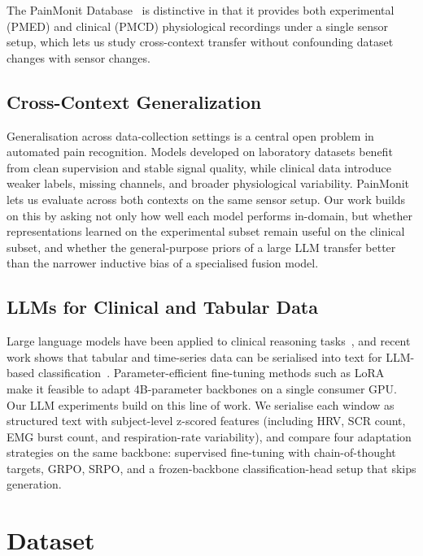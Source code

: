 \documentclass{article}
\begin{document}
The PainMonit Database~\citep{gouverneur2024painmonit} is distinctive in that it provides both experimental (PMED) and clinical (PMCD) physiological recordings under a single sensor setup, which lets us study cross-context transfer without confounding dataset changes with sensor changes.

\subsection{Cross-Context Generalization}

Generalisation across data-collection settings is a central open problem in automated pain recognition. Models developed on laboratory datasets benefit from clean supervision and stable signal quality, while clinical data introduce weaker labels, missing channels, and broader physiological variability. PainMonit~\citep{gouverneur2024painmonit} lets us evaluate across both contexts on the same sensor setup. Our work builds on this by asking not only how well each model performs in-domain, but whether representations learned on the experimental subset remain useful on the clinical subset, and whether the general-purpose priors of a large LLM transfer better than the narrower inductive bias of a specialised fusion model.

\subsection{LLMs for Clinical and Tabular Data}

Large language models have been applied to clinical reasoning tasks~\citep{singhal2023medpalm,nori2023gpt4medicine}, and recent work shows that tabular and time-series data can be serialised into text for LLM-based classification~\citep{hegselmann2023tabllm,liu2024timellm}. Parameter-efficient fine-tuning methods such as LoRA~\citep{hu2022lora} make it feasible to adapt 4B-parameter backbones on a single consumer GPU. Our LLM experiments build on this line of work. We serialise each window as structured text with subject-level z-scored features (including HRV, SCR count, EMG burst count, and respiration-rate variability), and compare four adaptation strategies on the same backbone: supervised fine-tuning with chain-of-thought targets, GRPO, SRPO, and a frozen-backbone classification-head setup that skips generation.

\section{Dataset}
\label{sec:dataset}
\end{document}
